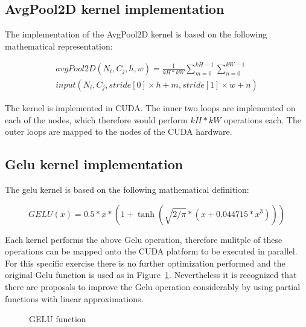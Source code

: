 \documentclass[letterpaper]{article}
\begin{document}
\subsection{AvgPool2D kernel implementation}
The implementation of the AvgPool2D kernel is based on the following mathematical representation:

\begin{equation}
\begin{aligned}
\label{eq::avgPoolEq} 
avgPool2D(N_i, C_j, h, w)  =  \frac{1}{kH * kW}  \sum_{m=0}^{kH-1} \sum_{n=0}^{kW-1} \\
                               input(N_i, C_j, stride[0] \times h + m, stride[1] \times w + n)
\end{aligned}
\end{equation}


The kernel is implemented in CUDA. The inner two loops are implemented on each of the nodes, which therefore would perform \(kH *kW\) operations each. The outer loops are mapped to the nodes of the CUDA hardware.  

\subsection{Gelu kernel implementation}

The gelu kernel is based on the following mathematical definition:  

\begin{equation}
\label{eq::geluEq} 
GELU(x) = 0.5 * x * (1 + \tanh(\sqrt{2 / \pi} * (x + 0.044715 * x^3)))
\end{equation}




Each kernel performs the above Gelu operation, therefore mulitple of these operations can be mapped onto the CUDA platform to be executed in parallel. For this specific exercise there is no further optimization performed and the original Gelu function is used as in Figure~\ref{geluFunc}. Nevertheless it is recognized that there are proposals to improve the Gelu operation considerably by using partial functions with linear approximations. 

\begin{figure}
\caption{GELU function}
\label{geluFunc}
\end{figure}
\end{document}
